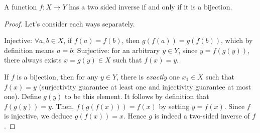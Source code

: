\documentclass[11pt]{article}
\begin{document}
\begin{theorem}
  A function \(f: X \rightarrow Y\) has a two sided inverse if and only if it is a bijection.
\end{theorem}
\begin{proof}
  Let's consider each ways separately.

  \subproof{\(\implies\)}
  Injective: \(\forall a,b \in X\), if \(f(a)=f(b)\), then \(g(f(a))=g(f(b))\), which by definition means \(a=b\); Surjective: for an arbitrary \(y \in Y\), since \(y=f(g(y))\), there always exists \(x=g(y) \in X\) such that \(f(x)=y\).

  \subproof{\(\impliedby\)}
  If \(f\) is a bijection, then for any \(y \in Y\), there is \textit{exactly} one \(x_1 \in X\) such that \(f(x)=y\) (surjectivity guarantee at least one and injectivity guarantee at most one). Define \(g(y)\) to be this element. It follows by definition that \(f(g(y))=y\). Then, \(f(g(f(x))) = f(x)\) by setting \(y=f(x)\). Since \(f\) is injective, we deduce \(g(f(x)) = x\). Hence \(g\) is indeed a two-sided inverse of \(f\).
\end{proof}
\end{document}
